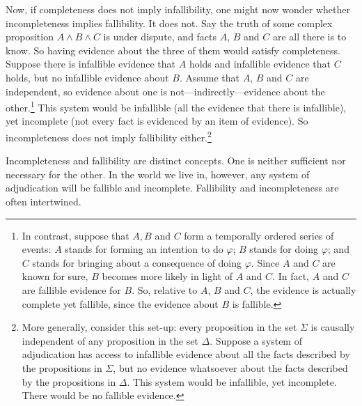 \documentclass[
  10pt,
  dvipsnames,enabledeprecatedfontcommands]{scrartcl}
\begin{document}
Now, if completeness does not imply infallibility, one might now wonder
whether incompleteness implies fallibility. It does not. Say the truth
of some complex proposition \(A \wedge B \wedge C\) is under dispute,
and facts \(A\), \(B\) and \(C\) are all there is to know. So having
evidence about the three of them would satisfy completeness. Suppose
there is infallible evidence that \(A\) holds and infallible evidence
that \(C\) holds, but no infallible evidence about \(B\). Assume that
\(A\), \(B\) and \(C\) are independent, so evidence about one is
not---indirectly---evidence about the other.\footnote{In contrast,
  suppose that \(A, B\) and \(C\) form a temporally ordered series of
  events: \(A\) stands for forming an intention to do \(\varphi\); \(B\)
  stands for doing \(\varphi\); and \(C\) stands for bringing about a
  consequence of doing \(\varphi\). Since \(A\) and \(C\) are known for
  sure, \(B\) becomes more likely in light of \(A\) and \(C\). In fact,
  \(A\) and \(C\) are fallible evidence for \(B\). So, relative to
  \(A\), \(B\) and \(C\), the evidence is actually complete yet
  fallible, since the evidence about \(B\) is fallible.} This system
would be infallible (all the evidence that there is infallible), yet
incomplete (not every fact is evidenced by an item of evidence). So
incompleteness does not imply fallibility either.\footnote{More
  generally, consider this set-up: every proposition in the set
  \(\Sigma\) is causally independent of any proposition in the set
  \(\Delta\). Suppose a system of adjudication has access to infallible
  evidence about all the facts described by the propositions in
  \(\Sigma\), but no evidence whatsoever about the facts described by
  the propositions in \(\Delta\). This system would be infallible, yet
  incomplete. There would be no fallible evidence.}

Incompleteness and fallibility are distinct concepts. One is neither
sufficient nor necessary for the other. In the world we live in,
however, any system of adjudication will be fallible and incomplete.
Fallibility and incompleteness are often intertwined.
\end{document}
